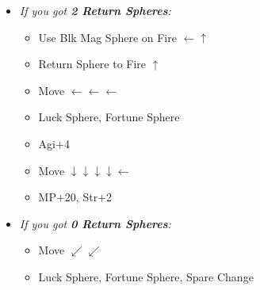 \begin{spheregrid}
\begin{itemize}
\begin{itemize}
            \item \textit{If you got \textbf{2 Return Spheres}:}
                \begin{itemize}
                    \item Use Blk Mag Sphere on Fire $\leftarrow\uparrow$
                    \item Return Sphere to Fire $\uparrow$
                    \item Move $\leftarrow\leftarrow\leftarrow$
                    \item Luck Sphere, Fortune Sphere
                    \item Agi+4
                    \item Move $\downarrow\downarrow\downarrow\downarrow\leftarrow$
                    \item MP+20, Str+2
                \end{itemize}
            \item \textit{If you got \textbf{0 Return Spheres}:}
                \begin{itemize}
                    \item Move $\swarrow\swarrow$
                    \item Luck Sphere, Fortune Sphere, Spare Change
                \end{itemize}

\end{itemize}
\end{itemize}
\end{spheregrid}
